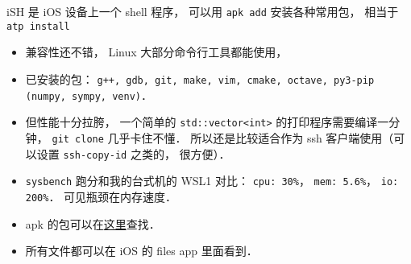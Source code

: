 
\begin{issues}
\issueDraft
\end{issues}

iSH 是 iOS 设备上一个 shell 程序， 可以用 \verb|apk add| 安装各种常用包， 相当于 \verb|atp install|

\begin{itemize}
\item 兼容性还不错， Linux 大部分命令行工具都能使用， \item 已安装的包： \verb|g++, gdb, git, make, vim, cmake, octave, py3-pip (numpy, sympy, venv)|．
\item 但性能十分拉胯， 一个简单的 \verb|std::vector<int>| 的打印程序需要编译一分钟， \verb|git clone| 几乎卡住不懂． 所以还是比较适合作为 ssh 客户端使用（可以设置 \verb|ssh-copy-id| 之类的， 很方便）．
\item \verb|sysbench| 跑分和我的台式机的 WSL1 对比： \verb|cpu: 30%|， \verb|mem: 5.6%|， \verb|io: 200%|． 可见瓶颈在内存速度．
\item apk 的包可以在\href{https://pkgs.alpinelinux.org/}{这里}查找．
\item 所有文件都可以在 iOS 的 files app 里面看到．
\end{itemize}

